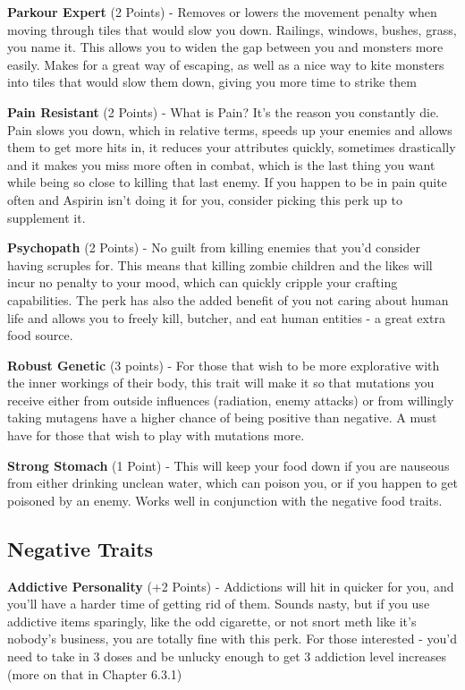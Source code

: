 \textbf{Parkour Expert} (2 Points) - Removes or lowers the movement penalty when moving through tiles that would slow you down. Railings, windows, bushes, grass, you name it. This allows you to widen the gap between you and monsters more easily. Makes for a great way of escaping, as well as a nice way to kite monsters into tiles that would slow them down, giving you more time to strike them

\textbf{Pain Resistant} (2 Points) - What is Pain? It's the reason you constantly die. Pain slows you down, which in relative terms, speeds up your enemies and allows them to get more hits in, it reduces your attributes quickly, sometimes drastically and it makes you miss more often in combat, which is the last thing you want while being so close to killing that last enemy. If you happen to be in pain quite often and Aspirin isn't doing it for you, consider picking this perk up to supplement it.

\textbf{Psychopath} (2 Points) - No guilt from killing enemies that you'd consider having scruples for. This means that killing zombie children and the likes will incur no penalty to your mood, which can quickly cripple your crafting capabilities. The perk has also the added benefit of you not caring about human life and allows you to freely kill, butcher, and eat human entities - a great extra food source.

\textbf{Robust Genetic} (3 points) - For those that wish to be more explorative with the inner workings of their body, this trait will make it so that mutations you receive either from outside influences (radiation, enemy attacks) or from willingly taking mutagens have a higher chance of being positive than negative. A must have for those that wish to play with mutations more.

\textbf{Strong Stomach} (1 Point) - This will keep your food down if you are nauseous from either drinking unclean water, which can poison you, or if you happen to get poisoned by an enemy. Works well in conjunction with the negative food traits.

\subsection{Negative Traits}

\textbf{Addictive Personality} (+2 Points) - Addictions will hit in quicker for you, and you'll have a harder time of getting rid of them. Sounds nasty, but if you use addictive items sparingly, like the odd cigarette, or not snort meth like it's nobody's business, you are totally fine with this perk. For those interested - you'd need to take in 3 doses and be unlucky enough to get 3 addiction level increases (more on that in Chapter 6.3.1)

